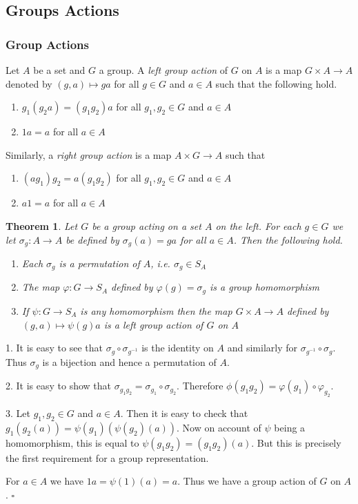 \documentclass[10pt]{article}
\newtheorem{theorem}{Theorem}[section]
\newenvironment{proof}[1][Proof]{\begin{trivlist}
\item[\hskip \labelsep {\itshape #1}]}{\end{trivlist}}
\newenvironment{definition}[1][Definition]{\begin{trivlist}
\item[\hskip \labelsep {\bfseries #1}]}{\end{trivlist}}
\begin{document}
\subsection{Groups Actions}

\subsubsection{Group Actions}

\begin{definition}
Let $A$ be a set and $G$ a group. A \emph{left group action} of $G$ on $A$ is a map $G\times A \to A$ denoted by $(g, a) \mapsto ga$ for all $g \in G$ and $a \in A$ such that the following hold.
\begin{enumerate}
\item $g_1(g_2a) = (g_1g_2)a$ for all $g_1, g_2 \in G$ and $a \in A$
\item $1a = a$ for all $a \in A$
\end{enumerate}
Similarly, a \emph{right group action} is a map $A\times G \to A$ such that
\begin{enumerate}
\item $(ag_1)g_2 = a(g_1g_2)$ for all $g_1, g_2 \in G$ and $a \in A$
\item $a1 = a$ for all $a \in A$
\end{enumerate}
\end{definition}

\begin{theorem}
Let $G$ be a group acting on a set $A$ on the left. For each $g \in G$ we let $\sigma_g : A \to A$ be defined by $\sigma_g(a) = ga$ for all $a \in A$. Then the following hold.
\begin{enumerate}
\item Each $\sigma_g$ is a permutation of $A$, i.e. $\sigma_g \in S_A$
\item The map $\varphi : G \to S_A$ defined by $\varphi(g) = \sigma_g$ is a group homomorphism
\item If $\psi : G \to S_A$ is any homomorphism then the map $G\times A \to A$ defined by $(g, a) \mapsto \psi(g)a$ is a left group action of $G$ on $A$
\end{enumerate}
\end{theorem}

\begin{proof}
1. It is easy to see that $\sigma_g\circ \sigma_{g^{-1}}$ is the identity on $A$ and similarly for $\sigma_{g^{-1}}\circ \sigma_g$. Thus $\sigma_g$ is a bijection and hence a permutation of $A$.

2. It is easy to show that $\sigma_{g_1g_2} = \sigma_{g_1}\circ\sigma_{g_2}$. Therefore $\phi(g_1g_2) = \varphi(g_1)\circ\varphi_{g_2}$.

3. Let $g_1, g_2 \in G$ and $a \in A$. Then it is easy to check that $g_1(g_2(a)) = \psi(g_1)(\psi(g_2)(a))$. Now on account of $\psi$ being a homomorphism, this is equal to $\psi(g_1g_2) = (g_1g_2)(a)$. But this is precisely the first requirement for a group representation.

For $a \in A$ we have $1a = \psi(1)(a) = a$. Thus we have a group action of $G$ on $A$. $\square$
\end{proof}
\end{document}
